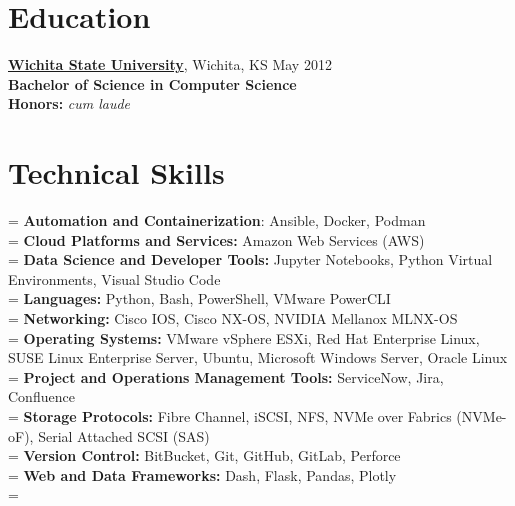 \documentclass[10pt]{article}       %
\begin{document}
\vspace{-16.5pt}


\section*{Education}
\textbf{\href{https://www.wichita.edu}{Wichita State University}}, Wichita, KS \hfill May 2012 \\
\vspace{1pt}
\textbf{Bachelor of Science in Computer Science} \\
\vspace{1pt}
\textbf{Honors:} \textit{cum laude} \\



\vspace{-10pt}

\section*{Technical Skills}
\newlength{\mylength}
\setlength{\mylength}{9.25em}

\hangindent=\mylength
\textbf{Automation and Containerization}: Ansible, Docker, Podman \\
\hangindent=\mylength
\textbf{Cloud Platforms and Services:} Amazon Web Services (AWS) \\
\hangindent=\mylength
\textbf{Data Science and Developer Tools:} Jupyter Notebooks, Python Virtual Environments, Visual Studio Code \\
\hangindent=\mylength
\textbf{Languages:} Python, Bash, PowerShell, VMware PowerCLI \\
\hangindent=\mylength
\textbf{Networking:} Cisco IOS, Cisco NX-OS, NVIDIA Mellanox MLNX-OS \\
\hangindent=\mylength
\textbf{Operating Systems:} VMware vSphere ESXi, Red Hat Enterprise Linux, SUSE Linux Enterprise Server, Ubuntu, Microsoft Windows Server, Oracle Linux \\
\hangindent=\mylength
\textbf{Project and Operations Management Tools:} ServiceNow, Jira, Confluence \\
\hangindent=\mylength
\textbf{Storage Protocols:} Fibre Channel, iSCSI, NFS, NVMe over Fabrics (NVMe-oF), Serial Attached SCSI (SAS) \\
\hangindent=\mylength
\textbf{Version Control:} BitBucket, Git, GitHub, GitLab, Perforce \\
\hangindent=\mylength
\textbf{Web and Data Frameworks:} Dash, Flask, Pandas, Plotly \\
\hangindent=\mylength
\end{document}
